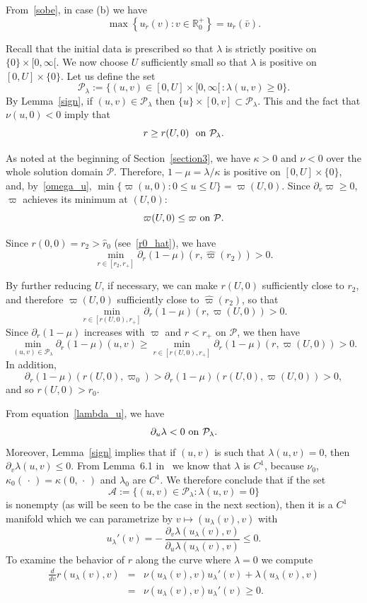 \documentclass[a4paper,11pt,oneside,reqno]{amsart}
\newcommand{\cal}{\mathcal}
\newcommand{\R}{\mathbb{R}}
\newcommand{\ckr}{\check{r}}
\newcommand{\uckr}{u_{\ckr}}
\begin{document}
From~\eqref{sobe}, in case (b) we have 
$$
\max\left\{\uckr(v):v\in\R^+_0\right\}=\uckr(\bar v).
$$

Recall that the initial data is prescribed so that $\lambda$ is strictly positive on $\{0\}\times[0,\infty[$.
We now choose $U$ sufficiently small so that $\lambda$ is positive on $[0,U]\times\{0\}$.
Let us define the set 
$$
{\cal P}_\lambda:=\{(u,v)\in[0,U]\times[0,\infty[\,:\lambda(u,v)\geq 0\}.
$$
By Lemma~\ref{sign}, if $(u,v) \in {\cal P}_\lambda$ then $\{u\}\times[0,v]\subset{\cal P}_\lambda$. This and the fact that $\nu(u,0)<0$ imply that $$r\geq r(U,0)\ \ {\rm on}\ {\cal P}_\lambda.$$

As noted at the beginning of Section~\ref{section3}, we have $\kappa>0$ and $\nu<0$ over the whole solution domain $\mathcal{P}$. Therefore, $1-\mu=\lambda/\kappa$ is positive on $[0,U]\times\{0\}$, and, by~\eqref{omega_u}, $\min\{\varpi(u,0):0\leq u\leq U\}=\varpi(U,0)$.
Since $\partial_v\varpi\geq 0$, $\varpi$ achieves its minimum at $(U,0)$:
$$
\varpi(U,0)\leq\varpi\ {\rm on}\ {\cal P}.
$$

Since $r(0,0)=r_2>\hat r_0$ (see~\eqref{r0_hat}), we have
$$
\min_{r\in [r_2,r_+]}{\partial_r(1-\mu)}(r,\hat\varpi(r_2))>0.
$$

By further reducing $U$, if necessary, we can make $r(U,0)$ sufficiently close to $r_2$, and therefore
$\varpi(U,0)$ sufficiently close to $\hat{\varpi}(r_2)$, so that
$$
\min_{r\in [r(U,0),r_+]}{\partial_r(1-\mu)}(r,\varpi(U,0))>0.
$$
Since $\partial_r(1-\mu)$ increases with $\varpi$ and $r<r_+$ on $\mathcal{P}$, we then have
$$
\min_{(u,v)\in{\cal P}_\lambda}\partial_r(1-\mu)(u,v)\geq\min_{r\in [r(U,0),r_+]}{\partial_r(1-\mu)}(r,\varpi(U,0))>0.
$$
In addition,
$$
\partial_r(1-\mu)(r(U,0),\varpi_0)>
\partial_r(1-\mu)(r(U,0),\varpi(U,0))>0,
$$ 
and so $r(U,0)>r_0$.

From equation~\eqref{lambda_u}, we have
\begin{equation}\label{dlmz}
\partial_u\lambda<0\ {\rm on}\ {\cal P}_\lambda.
\end{equation} 
Moreover, Lemma~\ref{sign} implies that if $(u,v)$ is such that $\lambda(u,v)=0$, then
$\partial_v\lambda(u,v)\leq 0$. From Lemma~6.1 in~\cite{relIst1} we know that $\lambda$ is $C^1$,
because $\nu_0$, $\kappa_0(\,\cdot\,)=\kappa(0,\,\cdot\,)$ and $\lambda_0$ are $C^1$. We therefore conclude that
if the set 
$$
{\cal A}:=\{(u,v)\in{\cal P}_\lambda:\lambda(u,v)=0\}
$$
is nonempty (as will be seen to be the case in the next section), then it is a $C^1$ manifold
which we can parametrize by $v\mapsto(u_\lambda(v),v)$ with
\begin{equation}\label{ulambdalinha}
u_\lambda'(v)=-\,
\frac{\partial_v\lambda(u_\lambda(v),v)}{\partial_u\lambda(u_\lambda(v),v)}\leq 0.
\end{equation}
To examine the behavior of $r$ along the curve where $\lambda=0$ we compute
\begin{eqnarray}
\frac{d}{dv}r(u_\lambda(v),v)&=&\nu(u_\lambda(v),v)u_\lambda'(v)+\lambda(u_\lambda(v),v)\nonumber\\
&=&\nu(u_\lambda(v),v)u_\lambda'(v)\geq 0.\label{ul}
\end{eqnarray}
\end{document}
